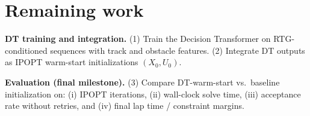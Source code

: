 \documentclass{article}
\begin{document}
\section{Remaining work}
\label{sec:remaining}

\textbf{DT training and integration.}
(1) Train the Decision Transformer on RTG-conditioned sequences with track and obstacle features.
(2) Integrate DT outputs as IPOPT warm-start initializations $(X_0,U_0)$.

\textbf{Evaluation (final milestone).}
(3) Compare DT-warm-start vs.\ baseline initialization on: (i) IPOPT iterations, (ii) wall-clock solve time, (iii) acceptance rate without retries, and (iv) final lap time / constraint margins.



\end{document}
